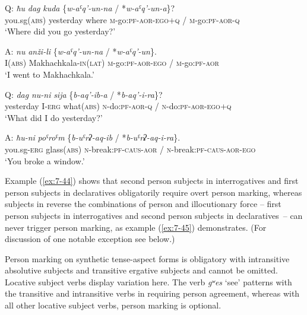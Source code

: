 ﻿\documentclass[output=paper]{langsci/langscibook}
\begin{document}
\ea\label{ex:7-44} %
\gll Q: \emph{ħu} \emph{dag} \emph{kuda} \{\emph{w-aˤq'-un-na} / *\emph{w-aˤq'-un-a}\}?\\
{} you.sg(\textsc{abs)} yesterday where \textsc{m}-go:\textsc{pf}-\textsc{aor}-\textsc{ego}+\textsc{q} / \textsc{m}-go:\textsc{pf}-\textsc{aor}-\textsc{q}\\
\glt `Where did you go yesterday?'

\gll A: \emph{nu} \emph{anži-li} \{\emph{w-aˤq'-un-na} / *\emph{w-aˤq'-un}\}.\\
{} I(\textsc{abs}) Makhachkala-\textsc{in(lat)} \textsc{m}-go:\textsc{pf}-\textsc{aor}-\textsc{ego} / \textsc{m}-go:\textsc{pf}-\textsc{aor}\\
\glt `I went to Makhachkala.'

\ex\label{ex:7-45} %
\gll Q: \emph{dag} \emph{nu-ni} \emph{sija} \{\emph{b-aq'-ib-a} / *\emph{b-aq'-i-ra}\}?\\
{} yesterday I-\textsc{erg} what(\textsc{abs}) \textsc{n}-do:\textsc{pf}-\textsc{aor}-\textsc{q} / \textsc{n}-do:\textsc{pf}-\textsc{aor}-\textsc{ego}+\textsc{q}\\
\glt `What did I do yesterday?'

\gll A: \emph{ħu-ni} \emph{poˤroˤm} \{\emph{b-uˤrʡ-aq-ib} / *\emph{b-uˤrʡ-aq-i-ra}\}.\\
{} you.sg-\textsc{erg} glass(\textsc{abs}) \textsc{n}-break:\textsc{pf}-\textsc{caus}-\textsc{aor} / \textsc{n}-break:\textsc{pf}-\textsc{caus}-\textsc{aor}-\textsc{ego}\\
\glt `You broke a window.'
\z

Example (\ref{ex:7-44}) shows that second person subjects in interrogatives and
first person subjects in declaratives obligatorily require overt
person marking, whereas subjects in reverse the combinations of person and
illocutionary force – first person subjects in interrogatives and second
person subjects in declaratives~– can never trigger person marking, as
example (\ref{ex:7-45}) demonstrates. (For discussion of one notable exception
see  below.)

Person marking on synthetic tense-aspect forms is obligatory with
intransitive absolutive subjects and transitive ergative subjects and
cannot be omitted. Locative subject verbs display variation here.
The verb \emph{gʷes} `see' patterns with the transitive and
intransitive verbs in requiring person agreement, whereas with all other
locative subject verbs, person marking is optional.
\end{document}
